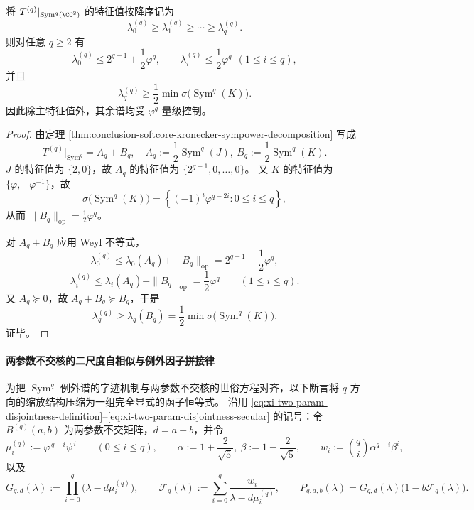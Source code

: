 \begin{theorem}[主谱与余谱的尺度分离]\label{thm:conclusion-softcore-spectral-scale-separation}
将
\(
T^{(q)}|_{\operatorname{Sym}^q(\CC^2)}
\)
的特征值按降序记为
\[
\lambda_0^{(q)}\ge\lambda_1^{(q)}\ge\cdots\ge\lambda_q^{(q)}.
\]
则对任意 \(q\ge 2\) 有
\[
\lambda_0^{(q)}\le 2^{q-1}+\frac12\varphi^q,
\qquad
\lambda_i^{(q)}\le\frac12\varphi^q\ \ (1\le i\le q),
\]
并且
\[
\lambda_q^{(q)}\ge
\frac12\min \sigma\!\bigl(\operatorname{Sym}^q(K)\bigr).
\]
因此除主特征值外，其余谱均受 \(\varphi^q\) 量级控制。
\end{theorem}
\begin{proof}
由定理 \ref{thm:conclusion-softcore-kronecker-sympower-decomposition} 写成
\[
T^{(q)}\big|_{\operatorname{Sym}^q}
=A_q+B_q,
\quad
A_q:=\frac12\operatorname{Sym}^q(J),\ 
B_q:=\frac12\operatorname{Sym}^q(K).
\]
\(J\) 的特征值为 \(\{2,0\}\)，故 \(A_q\) 的特征值为
\(\{2^{q-1},0,\dots,0\}\)。
又 \(K\) 的特征值为 \(\{\varphi,-\varphi^{-1}\}\)，故
\[
\sigma\!\bigl(\operatorname{Sym}^q(K)\bigr)
=\left\{(-1)^i\varphi^{q-2i}:0\le i\le q\right\},
\]
从而 \(\|B_q\|_{\mathrm{op}}=\frac12\varphi^q\)。

对 \(A_q+B_q\) 应用 Weyl 不等式，
\[
\lambda_0^{(q)}\le \lambda_0(A_q)+\|B_q\|_{\mathrm{op}}
=2^{q-1}+\frac12\varphi^q,
\]
\[
\lambda_i^{(q)}\le \lambda_i(A_q)+\|B_q\|_{\mathrm{op}}
=\frac12\varphi^q\qquad(1\le i\le q).
\]
又 \(A_q\succeq 0\)，故 \(A_q+B_q\succeq B_q\)，于是
\[
\lambda_q^{(q)}\ge \lambda_q(B_q)
=\frac12\min \sigma\!\bigl(\operatorname{Sym}^q(K)\bigr).
\]
证毕。
\end{proof}



\paragraph{两参数不交核的二尺度自相似与例外因子拼接律}
为把 \(\operatorname{Sym}^q\)-例外谱的字迹机制与两参数不交核的世俗方程对齐，以下断言将 \(q\)-方向的缩放结构压缩为一组完全显式的函子恒等式。
沿用 \eqref{eq:xi-two-param-disjointness-definition}--\eqref{eq:xi-two-param-disjointness-secular} 的记号：令 \(B^{(q)}(a,b)\) 为两参数不交矩阵，\(d=a-b\)，并令
\[
\mu_i^{(q)}:=\varphi^{\,q-i}\psi^{\,i}\qquad(0\le i\le q),
\qquad
\alpha:=1+\frac{2}{\sqrt5},\ \beta:=1-\frac{2}{\sqrt5},
\qquad
w_i:=\binom{q}{i}\alpha^{q-i}\beta^{i},
\]
以及
\[
G_{q,d}(\lambda):=\prod_{i=0}^{q}\bigl(\lambda-d\mu_i^{(q)}\bigr),\qquad
\mathcal F_q(\lambda):=\sum_{i=0}^{q}\frac{w_i}{\lambda-d\mu_i^{(q)}},
\qquad
P_{q,a,b}(\lambda)=G_{q,d}(\lambda)\bigl(1-b\mathcal F_q(\lambda)\bigr).
\]

